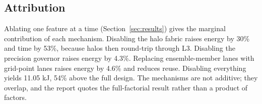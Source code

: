 \subsection{Attribution}
Ablating one feature at a time (Section~\ref{sec:results}) gives the marginal contribution of each
mechanism. Disabling the halo fabric raises energy by 30\% and time by 53\%, because halos then
round-trip through L3. Disabling the precision governor raises energy by 4.3\%. Replacing
ensemble-member lanes with grid-point lanes raises energy by 4.6\% and reduces reuse. Disabling
everything yields 11.05 kJ, 54\% above the full design. The mechanisms are not additive; they
overlap, and the report quotes the full-factorial result rather than a product of factors.
